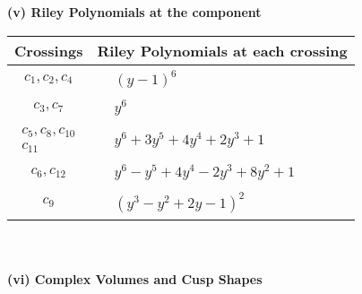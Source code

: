 \documentclass[1p]{elsarticle_modified}
\theoremstyle{definition}
\begin{document}
\newpage\renewcommand{\arraystretch}{1}
\flushleft \textbf{(v) Riley Polynomials at the component}\newline \\
\begin{tabular}{m{50pt}|m{274pt}}
Crossings & \hspace{64pt}Riley Polynomials at each crossing \\
\hline $$\begin{aligned}c_{1},c_{2},c_{4}\end{aligned}$$&$\begin{aligned}
&(y-1)^6
\end{aligned}$\\
\hline $$\begin{aligned}c_{3},c_{7}\end{aligned}$$&$\begin{aligned}
&y^6
\end{aligned}$\\
\hline $$\begin{aligned}c_{5},c_{8},c_{10}\\c_{11}\end{aligned}$$&$\begin{aligned}
&y^6+3 y^5+4 y^4+2 y^3+1
\end{aligned}$\\
\hline $$\begin{aligned}c_{6},c_{12}\end{aligned}$$&$\begin{aligned}
&y^6- y^5+4 y^4-2 y^3+8 y^2+1
\end{aligned}$\\
\hline $$\begin{aligned}c_{9}\end{aligned}$$&$\begin{aligned}
&(y^3- y^2+2 y-1)^2
\end{aligned}$\\
\hline
\end{tabular}\\~\\
\newpage\flushleft \textbf{(vi) Complex Volumes and Cusp Shapes}
\end{document}
